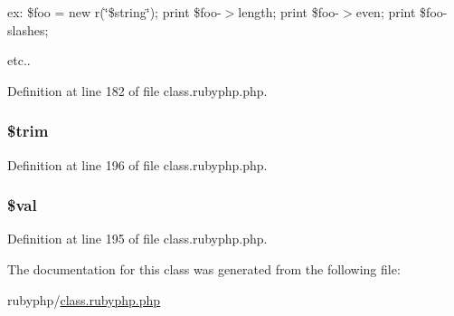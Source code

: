 ex\-: \$foo = new r(\char`\"{}\$string\char`\"{}); print \$foo-\/$>$length; print \$foo-\/$>$even; print \$foo-\/slashes;

etc.. 

Definition at line 182 of file class.\-rubyphp.\-php.

\hypertarget{classr_a0ca8b395aaa07c4aac3bdb1f9964d4f5}{
\subsubsection[{\$trim}]{\setlength{\rightskip}{0pt plus 5cm}\$trim}}\label{classr_a0ca8b395aaa07c4aac3bdb1f9964d4f5}


Definition at line 196 of file class.\-rubyphp.\-php.

\hypertarget{classr_aac81a74a7b30767af29bfd9a695636df}{
\subsubsection[{\$val}]{\setlength{\rightskip}{0pt plus 5cm}\${\bf val}}}\label{classr_aac81a74a7b30767af29bfd9a695636df}


Definition at line 195 of file class.\-rubyphp.\-php.



The documentation for this class was generated from the following file\-:\begin{DoxyCompactItemize}
\item 
rubyphp/\hyperlink{class_8rubyphp_8php}{class.\-rubyphp.\-php}\end{DoxyCompactItemize}
